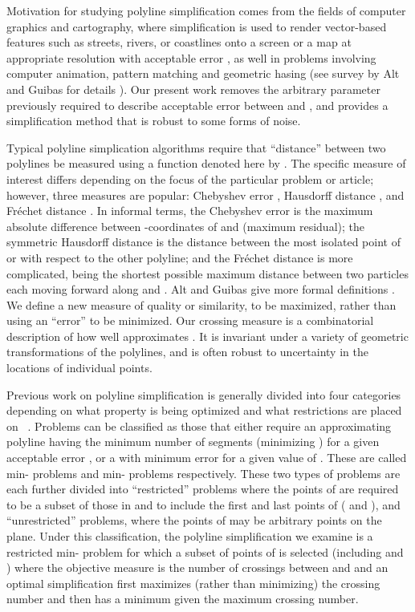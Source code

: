 \documentclass{article}
\begin{document}
Motivation for studying polyline simplification comes from the
fields of computer graphics and cartography, 
where simplification is used to render
vector-based features such as
streets, rivers, or coastlines onto a screen or a map at appropriate
resolution with acceptable error \cite{agarwal:2002},
as well in problems involving computer animation, pattern matching and  
geometric hasing (see survey by Alt and Guibas for details \cite{alt:1999}).
Our present work removes the arbitrary parameter
previously required to describe acceptable error between  and , and
provides a simplification method that is robust to some forms of noise.

Typical polyline simplication algorithms require that ``distance'' between
two polylines be measured using a function denoted here by . 
The specific measure of interest differs depending on the focus of the
particular problem or article; however, three measures are popular:
Chebyshev error , Hausdorff distance , and Fr\'{e}chet
distance .  In informal terms, the Chebyshev error is the maximum
absolute difference between -coordinates of  and  (maximum
residual); the symmetric Hausdorff distance is the distance between the most
isolated point of  or  with respect to the other polyline; and the
Fr\'{e}chet distance is more complicated, being the shortest possible
maximum distance between two particles each moving forward along  and
.  Alt and Guibas give more formal definitions \cite{alt:1999}.  We define
a new measure of quality or similarity, to be maximized, rather than using
an ``error'' to be minimized.  Our crossing measure is a combinatorial
description of how well  approximates .  It is invariant under a
variety of geometric transformations of the polylines, and is often robust to
uncertainty in the locations of individual points.

Previous work on polyline simplification is generally divided into
four categories depending on what property
is being optimized and what restrictions
are placed on ~\cite{alt:1999}. Problems can be classified as those
that either
require an approximating polyline  having the minimum number of segments 
(minimizing ) for a
given acceptable error , or a  with minimum
error  for a given value of .  These are called min-
problems and min- problems respectively.  These two types of
problems are each further divided into ``restricted'' problems where the
points of  are required to be a subset of those in  and to include the
first and last points of  ( and ), 
and ``unrestricted'' problems, where the
points of  may be arbitrary points on the plane.  Under this classification,
the polyline simplification  we examine is a restricted min- problem
for which a subset of points of  is selected (including  and )
where the objective measure
 is the number of crossings between  and  
and an optimal simplification first
maximizes (rather than minimizing) the crossing number and then has a
minimum  given the maximum crossing number.  
\end{document}
